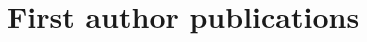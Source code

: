 \documentclass[a4paper,10pt]{article} %
\begin{document}
%
%
%
%
%
%
%
%
%



\section*{First author publications}
\end{document}
